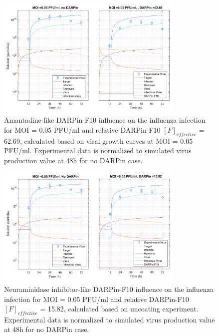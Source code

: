 \begin{figure}
\begin{center}
\includegraphics[width=0.8\textwidth, trim={0cm 0cm 0cm 0cm}, clip]{D_chapters/3_DARPinModels/2_DARPinInfection/comparisonModelTHillIRVViDelayMOI0.072135DARPin62.6898AsymmetricDarpinMyosinInhibitor.pdf}
\caption[Amantadine-like DARPin-F10 for MOI = 0.05 PFU/ml and $F_{effective}$ = 62.69]{Amantadine-like DARPin-F10 influence on the influenza infection for MOI = 0.05 PFU/ml and relative DARPin-F10 $[F]_{effective}$ = 62.69, calculated based on viral growth curves at MOI = 0.05 PFU/ml. Experimental data is normalized to simulated virus production value at 48h for no DARPin case.}
\label{figure:amantadineLikeF62}
\end{center}
\end{figure}

\begin{figure}
\begin{center}
\includegraphics[width=0.8\textwidth, trim={0cm 0cm 0cm 0cm}, clip]{D_chapters/3_DARPinModels/2_DARPinProduction/comparisonModelTHillIRVViDelayMOI0.072135DARPin15.816AsymmetricDarpinMyosinInhibitor.pdf}
\caption[Neuraminidase inhibitor-like DARPin-F10 for MOI = 0.05 PFU/ml and $F_{effective}$ = 15.82]{Neuraminidase inhibitor-like DARPin-F10 influence on the influenza infection for MOI = 0.05 PFU/ml and relative DARPin-F10 $[F]_{effective}$ = 15.82, calculated based on uncoating experiment. Experimental data is normalized to simulated virus production value at 48h for no DARPin case.}
\label{figure:neuraminidaseInhibitorLikeF15}
\end{center}
\end{figure}

